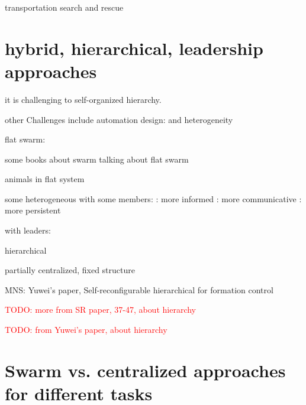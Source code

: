 \cite{tuci2018cooperative} transportation
\cite{robin2016multi} search and rescue

\section{hybrid, hierarchical, leadership approaches}

\cite{dorigo2020reflections} it is challenging to self-organized hierarchy.

other Challenges include automation design:
\cite{francesca2016automatic}
\cite{birattari2019automatic}
\cite{salman2024automatic}
and heterogeneity 
\cite{kengyel2015potential}

flat swarm:
\cite{viragh2014flocking}
\cite{vasarhelyi2018optimized}

some books about swarm talking about flat swarm
\cite{beni1988concept}
\cite{bonabeau1999swarm}
\cite{csahin2004swarm}
\cite{floreano2008bio}

animals in flat system
\cite{buhl2006disorder}
\cite{detrain2008collective}
\cite{theraulaz1998origin}

some heterogeneous with some members:
\cite{firat2020self} : more informed 
\cite{valentini2016collective} : more communicative
\cite{balazs2020adaptive} : more persistent

with leaders:
\cite{gu2009leader}
\cite{amraii2014explicit}
\cite{zheng2020adversarial}
\cite{shan2020collective}
\cite{kaiser2022innate}

hierarchical
\cite{dalmao2011cucker}
\cite{pignotti2018flocking}
\cite{jia2019modelling}
\cite{divband2019photomorphogenesis}

\cite{zhou2022swarm} partially centralized, fixed structure

MNS:
\cite{mathews2017mergeable}
\cite{zhu2020formation}
\cite{zhang2023self} Yuwei's paper, Self-reconfigurable hierarchical for formation control
\cite{jamshidpey2020multi}
\cite{jamshidpey2024centralization}
\cite{jamshidpey2023reducing}



\textcolor{red}{TODO: more from SR paper, 37-47, about hierarchy}


\textcolor{red}{TODO: from Yuwei's paper, about hierarchy}

\section{Swarm vs. centralized approaches for different tasks}

